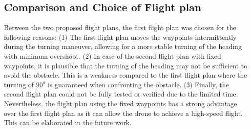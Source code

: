 \subsection{Comparison and Choice of Flight plan}
Between the two proposed flight plans, the first flight plan was chosen for the following reasons: (1) The first flight plan moves the waypoints intermittently during the turning maneuver, allowing for a more stable turning of the heading with minimum overshoot. (2) In case of the second flight plan with fixed waypoints, it is plausible that the turning of the heading may not be sufficient to avoid the obstacle. This is a weakness compared to the first flight plan where the turning of $90^o$ is guaranteed when confronting the obstacle. (3) Finally, the second flight plan could not be fully tested or verified due to the limited time. Nevertheless, the flight plan using the fixed waypoints has a strong advantage over the first flight plan as it can allow the drone to achieve a high-speed flight. This can be elaborated in the future work.